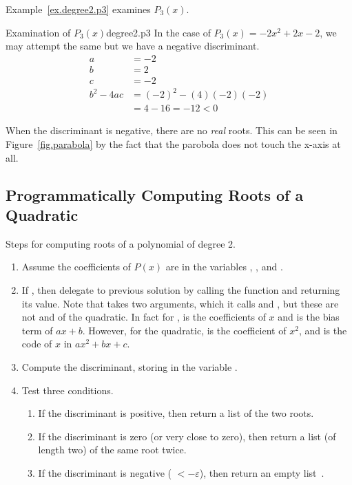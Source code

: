 Example~\ref{ex.degree2.p3} examines $P_3(x)$.

\begin{example}{Examination of $P_3(x)$}{degree2.p3}
  In the case of $P_3(x) = -2x^2 + 2x -2$, we may attempt the same but we have a negative discriminant.
  \begin{align*}
    a&=-2\\
    b&=2\\
    c&=-2\\
    b^2 - 4a c  &=(-2)^2 - (4)(-2)(-2)\\
    &= 4 - 16 = -12 < 0
  \end{align*}

When the discriminant
is negative, there are no \emph{real} roots.  This can be seen in
Figure~\ref{fig.parabola} by the fact that the parobola does not
touch the x-axis at all.
\end{example}

\subsection{Programmatically Computing Roots of a Quadratic}

Steps for computing roots of a polynomial of degree 2.
\begin{enumerate}
\item Assume the coefficients of $P(x)$ are in the variables , , and .
\item If , then delegate to previous solution by calling the function  and returning its value.  Note that  takes two arguments, which it calls  and , but these are not  and  of the quadratic.   In fact for ,  is the coefficients of $x$ and  is the bias term of $a x + b$.  However, for the quadratic,  is the coefficient of $x^2$, and  is the code of $x$ in $a x^2 + b x + c$.
\item Compute the discriminant, storing in the variable .
\item Test three conditions.
  \begin{enumerate}
  \item If the discriminant is positive, then return a list of the two roots.
  \item If the discriminant is zero (or very close to zero), then return a list (of length two) of the same root twice.
  \item If the discriminant is negative ( $< -\varepsilon$), then return an empty list~\code{[]}.
  \end{enumerate}
\end{enumerate}


